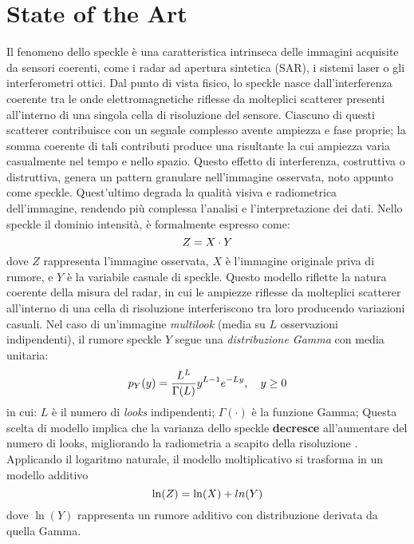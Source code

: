 
\chapter{State of the Art}
Il fenomeno dello speckle è una caratteristica intrinseca delle immagini acquisite da sensori coerenti, 
come i radar ad apertura sintetica (SAR), i sistemi laser o gli interferometri ottici. 
Dal punto di vista fisico, lo speckle nasce dall’interferenza coerente tra le onde elettromagnetiche riflesse 
da molteplici scatterer presenti all’interno di una singola cella di risoluzione del sensore. 
Ciascuno di questi scatterer contribuisce con un segnale complesso avente ampiezza e fase proprie; 
la somma coerente di tali contributi produce una risultante la cui ampiezza varia casualmente nel tempo e nello spazio.  
Questo effetto di interferenza, costruttiva o distruttiva, genera un pattern granulare nell’immagine osservata, 
noto appunto come speckle. Quest'ultimo degrada la qualità visiva e radiometrica dell’immagine, rendendo più complessa l’analisi e l’interpretazione dei dati.
Nello speckle il dominio intensità, è formalmente espresso come:
\[
    \makebox[\textwidth][c]{%
      $\displaystyle
      Z = X \cdot Y
      $%
    }
\]
dove $Z$ rappresenta l'immagine osservata, $X$ è l'immagine originale priva di rumore, 
e $Y$ è la variabile casuale di speckle. Questo modello riflette la natura coerente 
della misura del radar, in cui le ampiezze riflesse da molteplici scatterer all’interno di 
una cella di risoluzione interferiscono tra loro producendo variazioni casuali.
Nel caso di un'immagine \textit{multilook} (media su $L$ osservazioni indipendenti), 
il rumore speckle $Y$ segue una \textit{distribuzione Gamma} con media unitaria:
\begin{equation}
    \makebox[\textwidth][c]{%
      $\displaystyle
      p_Y(y) = \frac{L^L}{\Gamma(L)} y^{L-1} e^{-Ly}, \quad y \ge 0
      $%
    }
  \end{equation}
in cui: $L$ è il numero di \emph{looks} indipendenti; $\Gamma(\cdot)$ è la funzione Gamma;
Questa scelta di modello implica che la varianza dello speckle \textbf{decresce} all'aumentare 
del numero di looks, migliorando la radiometria a scapito della risoluzione \cite{4767223}.
Applicando il logaritmo naturale, il modello moltiplicativo si trasforma 
in un modello additivo
\[
    \makebox[\textwidth][c]{%
      $\displaystyle
      \ln(Z) = \ln(X) + ln(Y)
      $%
    }
\]
dove $\ln(Y)$ rappresenta un rumore additivo con distribuzione derivata da quella Gamma. 
